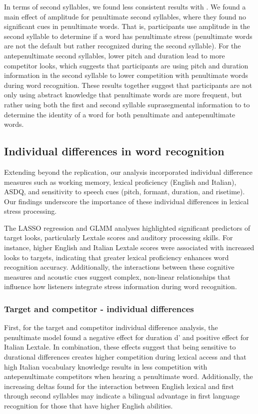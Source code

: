 In terms of second syllables, we found less consistent results with \cite{Sulpizio_McQueen_2012}. We found a main effect of amplitude for penultimate second syllables, where they found no significant cues in penultimate words. That is, participants use amplitude in the second syllable to determine if a word has penultimate stress (penultimate words are not the default but rather recognized during the second syllable). For the antepenultimate second syllables, lower pitch and duration lead to more competitor looks, which suggests that participants are using pitch and duration information in the second syllable to lower competition with penultimate words during word recognition. These results together suggest that participants are not only using abstract knowledge that penultimate words are more frequent, but rather using both the first and second syllable suprasegmental information to to determine the identity of a word for both penultimate and antepenultimate words.

\subsection{Individual differences in word recognition}
Extending beyond the replication, our analysis incorporated individual difference measures such as working memory, lexical proficiency (English and Italian), ASDQ, and sensitivity to speech cues (pitch, formant, duration, and risetime). Our findings underscore the importance of these individual differences in lexical stress processing.

The LASSO regression and GLMM analyses highlighted significant predictors of target looks, particularly Lextale scores and auditory processing skills. For instance, higher English and Italian Lextale scores were associated with increased looks to targets, indicating that greater lexical proficiency enhances word recognition accuracy. Additionally, the interactions between these cognitive measures and acoustic cues suggest complex, non-linear relationships that influence how listeners integrate stress information during word recognition.


\subsubsection{Target and competitor - individual differences}
First, for the target and competitor individual difference analysis, the penultimate model found a negative effect for duration d' and positive effect for Italian Lextale. In combination, these effects suggest that being sensitive to durational differences creates higher competition during lexical access and that high Italian vocabulary knowledge results in less competition with antepenultimate competitors when hearing a penultimate word. Additionally, the increasing deltas found for the interaction between English lexical and first through second syllables may indicate a bilingual advantage in first language recognition for those that have higher English abilities. 

